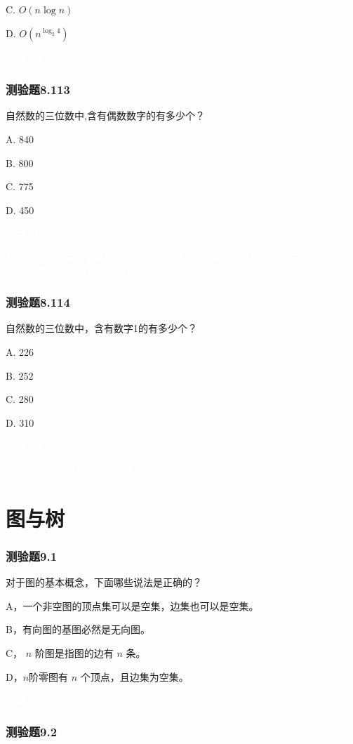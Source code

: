 \documentclass[UTF8, heading=true]{ctexart}
\begin{document}
C. $O(n \log n)$

D. $O\left(n^{\log _2 4}\right)$

\textcolor{white}{答案：A}

\subsubsection{测验题8.113}

自然数的三位数中,含有偶数数字的有多少个？

A. 840

B. 800

C. 775

D. 450

\textcolor{white}{答案：C}

\textcolor{white}{解析：这道题来源于第三次小测的第三题。\textit{测验题8.14}有与这道题完全相同的题目,不清楚为什么又在这里出现。}


\subsubsection{测验题8.114}

自然数的三位数中，含有数字1的有多少个？

A. 226

B. 252

C. 280

D. 310

\textcolor{white}{答案：B}

\textcolor{white}{解析：题同\textit{测验题8.32}第二问。}

\clearpage

\section{图与树}

\subsubsection{测验题9.1}

对于图的基本概念，下面哪些说法是正确的？

A，一个非空图的顶点集可以是空集，边集也可以是空集。

B，有向图的基图必然是无向图。

C， $n$ 阶图是指图的边有 $n$ 条。

D，$n$阶零图有 $n$ 个顶点，且边集为空集。

\textcolor{white}{答案：BD}

\subsubsection{测验题9.2}
\end{document}

